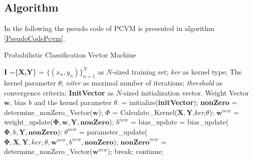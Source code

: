 \subsection{Algorithm}\label{PcSubSecAlgo}
In the following the pseudo code of \acs{PCVM} is presented in algorithm \ref{PseudoCodePcvm}.
\begin{algorithm}[H]
	\caption{Probabilistic Classification Vector Machine}\label{PseudoCodePcvm}	
	\begin{algorithmic}[1]
		\Require $\mathbf{I}$ =\{\textbf{X,Y}\} = $\{(x_n,y_n)\}_{n=1}^{N}$ as $N$-sized training set;
		\textit{ker} as kernel type; The kernel parameter $\theta$; \textit{niter} as maximal number of iterations; \textit{threshold} as convergence criteria; \textbf{InitVector} as $N$-sized initialization vector.
		\Ensure Weight Vector $\mathbf{w}$, bias $b$ and the kernel parameter $\theta$.
		\State	[$\mathbf{w},b$] = initialize(\textbf{initVector});
		\State \textbf{nonZero} = determine\_nonZero\_Vector($\mathbf{w}$); 
			\State $\Phi$ = Calculate\_Kernel($\mathbf{X,Y}$,\textit{ker},$\theta$); 
			\State $\mathbf{w}^{new}$ = weight\_update($\mathbf{\Phi,w,Y,nonZero}$);  
			\State $b^{new}$ = bias\_update = bias\_update($\mathbf{\Phi},b,\mathbf{Y,nonZero}$);
			\State $\theta^{new}$ = parameter\_update($\mathbf{\Phi,X,Y},\mathit{ker},\theta,\mathbf{w}^{new},b^{new},\mathbf{nonZero}$);
			\State $\mathbf{nonZero}^{new}$ = determine\_nonZero\_Vector($\mathbf{w}^{new}$);
					\State break;
				\Else
					\State continue;
				\EndIf
		\EndFor
	\end{algorithmic}
\end{algorithm}
\\

